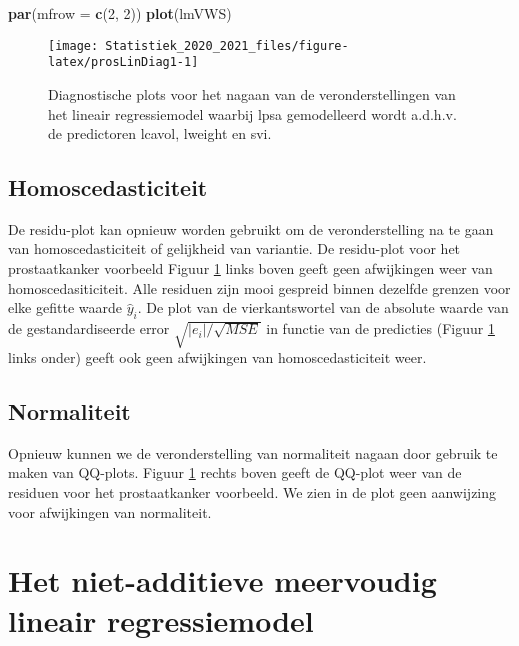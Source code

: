 \documentclass[
  12pt,dutch,coursenotes]{book}
\newenvironment{Shaded}{\begin{snugshade}}{\end{snugshade}}
\newcommand{\DataTypeTok}[1]{\textcolor[rgb]{0.13,0.29,0.53}{#1}}
\newcommand{\DecValTok}[1]{\textcolor[rgb]{0.00,0.00,0.81}{#1}}
\newcommand{\KeywordTok}[1]{\textcolor[rgb]{0.13,0.29,0.53}{\textbf{#1}}}
\newcommand{\NormalTok}[1]{#1}
\theoremstyle{definition}
\theoremstyle{definition}
\theoremstyle{definition}
\theoremstyle{remark}
\begin{document}
\begin{Shaded}
\begin{Highlighting}[]
\KeywordTok{par}\NormalTok{(}\DataTypeTok{mfrow =} \KeywordTok{c}\NormalTok{(}\DecValTok{2}\NormalTok{, }\DecValTok{2}\NormalTok{))}
\KeywordTok{plot}\NormalTok{(lmVWS)}
\end{Highlighting}
\end{Shaded}

\begin{figure}

{\centering \texttt{[image: Statistiek\_2020\_2021\_files/figure-latex/prosLinDiag1-1]} 

}

\caption{Diagnostische plots voor het nagaan van de veronderstellingen van het lineair regressiemodel waarbij lpsa gemodelleerd wordt a.d.h.v. de predictoren lcavol, lweight en svi.}\label{fig:prosLinDiag1}
\end{figure}

\hypertarget{homoscedasticiteit}{%
\subsection{Homoscedasticiteit}\label{homoscedasticiteit}}

De residu-plot kan opnieuw worden gebruikt om de veronderstelling na te gaan van homoscedasticiteit of gelijkheid van variantie.
De residu-plot voor het prostaatkanker voorbeeld Figuur \ref{fig:prosLinDiag1} links boven geeft geen afwijkingen weer van homoscedasiticiteit.
Alle residuen zijn mooi gespreid binnen dezelfde grenzen voor elke gefitte waarde \(\hat y_i\).
De plot van de vierkantswortel van de absolute waarde van de gestandardiseerde error \(\sqrt{|e_i|/\sqrt{MSE}}\) in functie van de predicties (Figuur \ref{fig:prosLinDiag1} links onder) geeft ook geen afwijkingen van homoscedasticiteit weer.

\hypertarget{normaliteit}{%
\subsection{Normaliteit}\label{normaliteit}}

Opnieuw kunnen we de veronderstelling van normaliteit nagaan door gebruik te maken van QQ-plots. Figuur \ref{fig:prosLinDiag1} rechts boven geeft de QQ-plot weer van de residuen voor het prostaatkanker voorbeeld. We zien in de plot geen aanwijzing voor afwijkingen van normaliteit.

\hypertarget{het-niet-additieve-meervoudig-lineair-regressiemodel}{%
\section{Het niet-additieve meervoudig lineair regressiemodel}\label{het-niet-additieve-meervoudig-lineair-regressiemodel}}
\end{document}
